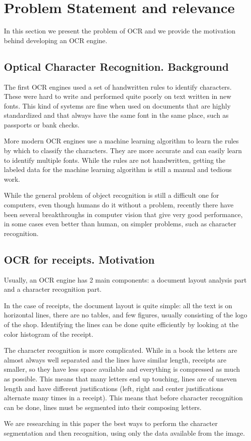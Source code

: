 \section{Problem Statement and relevance}
\label{sec:statement}
In this section we present the problem of OCR and we provide the motivation behind developing an OCR engine. 

\subsection{Optical Character Recognition. Background}

The first OCR engines used a set of handwritten rules to identify characters. These were hard to write and performed quite poorly on text written in new fonts. This kind of systems are fine when used on documents that are highly standardized and that always have the same font in the same place, such as passports or bank checks. 

More modern OCR engines use a machine learning algorithm to learn the rules by which to classify the characters. They are more accurate and can easily learn to identify multiple fonts. While the rules are not handwritten, getting the labeled data for the machine learning algorithm is still a manual and tedious work. 

While the general problem of object recognition is still a difficult one for computers, even though humans do it without a problem, recently there have been several breakthroughs in computer vision that give very good performance, in some cases even better than human, on simpler problems, such as character recognition. 

\subsection{OCR for receipts. Motivation}
Usually, an OCR engine has 2 main components: a document layout analysis part and a character recognition part. 

In the case of receipts, the document layout is quite simple: all the text is on horizontal lines, there are no tables, and few figures, usually consisting of the logo of the shop. Identifying the lines can be done quite efficiently by looking at the color histogram of the receipt. 

The character recognition is more complicated. While in a book the letters are almost always well separated and the lines have similar length, receipts are smaller, so they have less space available and everything is compressed as much as possible. This means that many letters end up touching, lines are of uneven length and have different justifications (left, right and center justifications alternate many times in a receipt). This means that before character recognition can be done, lines must be segmented into their composing letters. 

We are researching in this paper the best ways to perform the character segmentation and then recognition, using only the data available from the image. 
